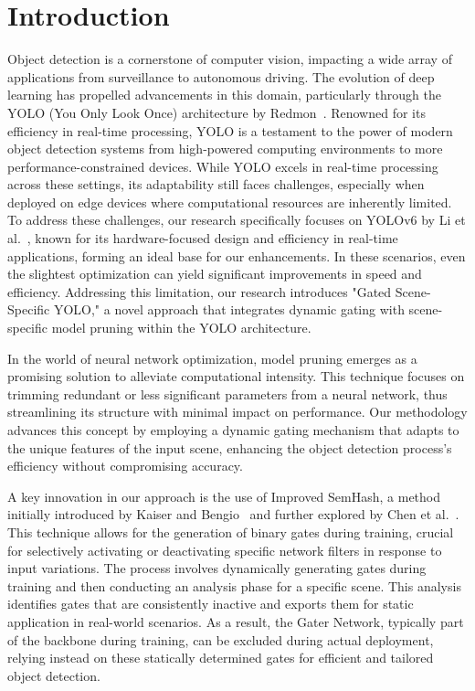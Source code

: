 \documentclass[runningheads]{llncs}
\begin{document}
\section{Introduction}
Object detection is a cornerstone of computer vision, impacting a wide array of applications from surveillance to autonomous driving. The evolution of deep learning has propelled advancements in this domain, particularly through the YOLO (You Only Look Once) architecture by Redmon~\cite{redmon2016you}. Renowned for its efficiency in real-time processing, YOLO is a testament to the power of modern object detection systems from high-powered computing environments to more performance-constrained devices. While YOLO excels in real-time processing across these settings, its adaptability still faces challenges, especially when deployed on edge devices where computational resources are inherently limited. To address these challenges, our research specifically focuses on YOLOv6 by Li et al.~\cite{li2023yolov6,li2022yolov6}, known for its hardware-focused design and efficiency in real-time applications, forming an ideal base for our enhancements. In these scenarios, even the slightest optimization can yield significant improvements in speed and efficiency. Addressing this limitation, our research introduces "Gated Scene-Specific YOLO," a novel approach that integrates dynamic gating with scene-specific model pruning within the YOLO architecture.

In the world of neural network optimization, model pruning emerges as a promising solution to alleviate computational intensity. This technique focuses on trimming redundant or less significant parameters from a neural network, thus streamlining its structure with minimal impact on performance. Our methodology advances this concept by employing a dynamic gating mechanism that adapts to the unique features of the input scene, enhancing the object detection process's efficiency without compromising accuracy.

A key innovation in our approach is the use of Improved SemHash, a method initially introduced by Kaiser and Bengio~\cite{kaiser2018discrete} and further explored by Chen et al.~\cite{chen2019you}. This technique allows for the generation of binary gates during training, crucial for selectively activating or deactivating specific network filters in response to input variations. The process involves dynamically generating gates during training and then conducting an analysis phase for a specific scene. This analysis identifies gates that are consistently inactive and exports them for static application in real-world scenarios. As a result, the Gater Network, typically part of the backbone during training, can be excluded during actual deployment, relying instead on these statically determined gates for efficient and tailored object detection.
\end{document}
